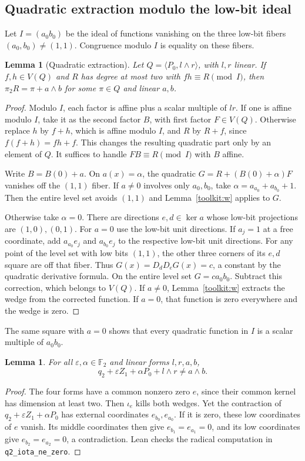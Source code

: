 \documentclass[11pt,a4paper]{article}
\theoremstyle{plain}
\newtheorem{lemma}[theorem]{Lemma}
\theoremstyle{remark}
\theoremstyle{plain}
\newcommand{\F}{\mathbb F_2}
\begin{document}
\subsection{Quadratic extraction modulo the low-bit ideal}
Let $I=(a_0b_0)$ be the ideal of functions vanishing on the three low-bit fibers $(a_0,b_0)\ne(1,1)$. Congruence modulo $I$ is equality on these fibers.

\begin{lemma}[Quadratic extraction]\label{l2:lem:ideal}
Let $Q=\langle P_0,l\wedge r\rangle$, with $l,r$ linear. If $f,h\in V(Q)$ and $R$ has degree at most two with $fh\equiv R\pmod I$, then $\pi_2R=\pi+a\wedge b$ for some $\pi\in Q$ and linear $a,b$.
\end{lemma}
\begin{proof}
Modulo $I$, each factor is affine plus a scalar multiple of $lr$. If one is affine modulo $I$, take it as the second factor $B$, with first factor $F\in V(Q)$. Otherwise replace $h$ by $f+h$, which is affine modulo $I$, and $R$ by $R+f$, since $f(f+h)=fh+f$. This changes the resulting quadratic part only by an element of $Q$. It suffices to handle $FB\equiv R\pmod I$ with $B$ affine.

Write $B=B(0)+a$. On $a(x)=\alpha$, the quadratic $G=R+(B(0)+\alpha)F$ vanishes off the $(1,1)$ fiber. If $a\ne0$ involves only $a_0,b_0$, take $\alpha=a_{a_0}+a_{b_0}+1$. Then the entire level set avoids $(1,1)$ and Lemma~\ref{toolkit:w} applies to $G$.

Otherwise take $\alpha=0$. There are directions $e,d\in\ker a$ whose low-bit projections are $(1,0),(0,1)$. For $a=0$ use the low-bit unit directions. If $a_j=1$ at a free coordinate, add $a_{a_0}e_j$ and $a_{b_0}e_j$ to the respective low-bit unit directions. For any point of the level set with low bits $(1,1)$, the other three corners of its $e,d$ square are off that fiber. Thus $G(x)=D_dD_eG(x)=c$, a constant by the quadratic derivative formula. On the entire level set $G=ca_0b_0$. Subtract this correction, which belongs to $V(Q)$. If $a\ne0$, Lemma~\ref{toolkit:w} extracts the wedge from the corrected function. If $a=0$, that function is zero everywhere and the wedge is zero.
\end{proof}
The same square with $a=0$ shows that every quadratic function in $I$ is a scalar multiple of $a_0b_0$.

\begin{lemma}\label{l2:lem:rankext}
For all $\varepsilon,\alpha\in\F$ and linear forms $l,r,a,b$,
\[
q_2+\varepsilon Z_1+\alpha P_0+l\wedge r\ne a\wedge b .
\]
\end{lemma}
\begin{proof}
The four forms have a common nonzero zero $e$, since their common kernel has dimension at least two. Then $\iota_e$ kills both wedges. Yet the contraction of $q_2+\varepsilon Z_1+\alpha P_0$ has external coordinates $e_{b_0},e_{a_0}$. If it is zero, these low coordinates of $e$ vanish. Its middle coordinates then give $e_{b_1}=e_{a_1}=0$, and its low coordinates give $e_{b_2}=e_{a_2}=0$, a contradiction. Lean checks the radical computation in \nolinkurl{q2_iota_ne_zero}.
\end{proof}
\end{document}
